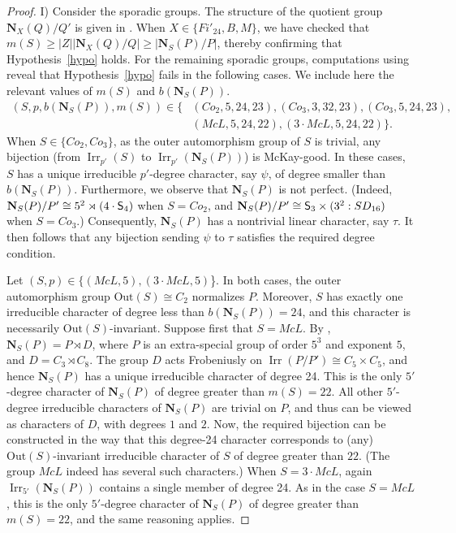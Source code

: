 \documentclass[12pt]{amsart}
\theoremstyle{plain}
\theoremstyle{definition}
\numberwithin{equation}{section}
\newcommand{\Irr}{\operatorname{Irr}}
\newcommand{\bN}{\mathbf{N}}
\newcommand{\Out}{{\mathrm {Out}}}
\newcommand{\Sy}{\textup{\textsf{S}}}
\begin{document}
\begin{proof}
\medskip

I) Consider the sporadic groups. The structure of the quotient group
$\bN_X(Q)/Q'$ is given in \cite{Wilson98}. When
$X\in\{Fi'_{24},B,M\}$, we have checked that $m(S)\geq
|Z||\bN_X(Q)/Q|\geq |\bN_S(P)/P|$, thereby confirming that
Hypothesis~\ref{hypo} holds. For the remaining sporadic groups,
computations using \cite{GAP} reveal that Hypothesis~\ref{hypo}
fails in the following cases. We include here the relevant values of
$m(S)$ and $b(\bN_S(P))$.
\begin{align*}(S,p,b(\bN_S(P)),m(S))\in\{&(Co_2, 5, 24, 23), (Co_3, 3, 32, 23),
(Co_3, 5, 24, 23),\\ &(McL, 5, 24, 22), (3\cdot McL, 5, 24, 22)\}.
\end{align*}
When $S\in\{Co_2,Co_3\}$, as the outer automorphism group of $S$ is
trivial, any bijection (from $\Irr_{p'}(S)$ to
$\Irr_{p'}(\bN_S(P))$) is McKay-good. In these cases, $S$ has a
unique irreducible $p'$-degree character, say $\psi$, of degree
smaller than $b(\bN_S(P))$. Furthermore, we observe that $\bN_S(P)$
is not perfect. (Indeed, $\bN_S(P)/P' \cong 5^2 \rtimes (4 \cdot
\Sy_4)$ when $S = Co_2$, and $\bN_S(P)/P' \cong \Sy_3 \times
(3^2:SD_{16})$ when $S = Co_3$.) Consequently, $\bN_S(P)$ has a
nontrivial linear character, say $\tau$. It then follows that any
bijection sending $\psi$ to $\tau$ satisfies the required degree
condition.

Let $(S,p)\in\{(McL, 5),(3\cdot McL, 5)$\}. In both cases, the outer
automorphism group $\Out(S)\cong C_2$ normalizes $P$. Moreover, $S$
has exactly one irreducible character of degree less than
$b(\bN_S(P))=24$, and this character is necessarily
$\Out(S)$-invariant. Suppose first that $S=McL$. By \cite{Atlas},
$\bN_S(P)=P\rtimes D$, where $P$ is an extra-special group of order
$5^3$ and exponent $5$, and $D=C_3\rtimes C_8$. The group $D$ acts
Frobeniusly on $\Irr(P/P')\cong C_5\times C_5$, and hence $\bN_S(P)$
has a unique irreducible character of degree 24. This is the only
$5'$-degree character of $\bN_S(P)$ of degree greater than
$m(S)=22$. All other $5'$-degree irreducible characters of
$\bN_S(P)$ are trivial on $P$, and thus can be viewed as characters
of $D$, with degrees $1$ and $2$. Now, the required bijection can be
constructed in the way that this degree-24 character corresponds to
(any) $\Out(S)$-invariant irreducible character of $S$ of degree
greater than $22$. (The group $McL$ indeed has several such
characters.) When $S=3\cdot McL$, again $\Irr_{5'}(\bN_S(P))$
contains a single member of degree 24. As in the case $S=McL$, this
is the only $5'$-degree character of $\bN_S(P)$ of degree greater
than $m(S)=22$, and the same reasoning applies.





\end{proof}
\end{document}
